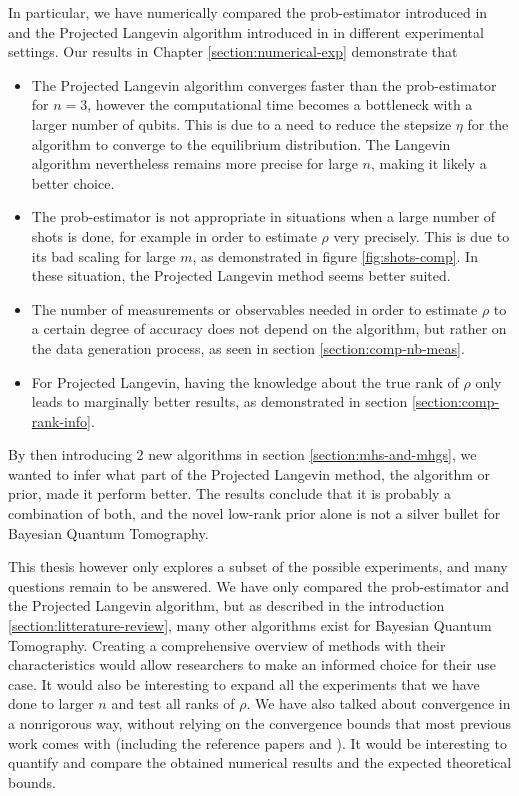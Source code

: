 \documentclass[12pt]{memoir}
\begin{document}
In particular, we have numerically compared the prob-estimator introduced in \cite{MA17} and the Projected Langevin algorithm introduced in \cite{meth:bayesian:Langevin:ACMT2024} in different experimental settings. Our results in Chapter \ref{section:numerical-exp} demonstrate that 
\begin{itemize}
    \item The Projected Langevin algorithm converges faster than the prob-estimator for $n=3$, however the computational time becomes a bottleneck with a larger number of qubits. This is due to a need to reduce the stepsize $\eta$ for the algorithm to converge to the equilibrium distribution. The Langevin algorithm nevertheless remains more precise for large $n$, making it likely a better choice.
    \item The prob-estimator is not appropriate in situations when a large number of shots is done, for example in order to estimate $\rho$ very precisely. This is due to its bad scaling for large $m$, as demonstrated in figure \ref{fig:shots-comp}. In these situation, the Projected Langevin method seems better suited.
    \item The number of measurements or observables needed in order to estimate $\rho$ to a certain degree of accuracy does not depend on the algorithm, but rather on the data generation process, as seen in section \ref{section:comp-nb-meas}.
    \item For Projected Langevin, having the knowledge about the true rank of $\rho$ only leads to marginally better results, as demonstrated in section \ref{section:comp-rank-info}.
\end{itemize}
By then introducing 2 new algorithms in section \ref{section:mhs-and-mhgs}, we wanted to infer what part of the Projected Langevin method, the algorithm or prior, made it perform better. The results conclude that it is probably a combination of both, and the novel low-rank prior alone is not a silver bullet for Bayesian Quantum Tomography.\medbreak 

This thesis however only explores a subset of the possible experiments, and many questions remain to be answered. We have only compared the prob-estimator and the Projected Langevin algorithm, but as described in the introduction \ref{section:litterature-review}, many other algorithms exist for Bayesian Quantum Tomography. Creating a comprehensive overview of methods with their characteristics would allow researchers to make an informed choice for their use case. It would also be interesting to expand all the experiments that we have done to larger $n$ and test all ranks of $\rho$. We have also talked about convergence in a nonrigorous way, without relying on the convergence bounds that most previous work comes with (including the reference papers \cite{MA17} and \cite{meth:bayesian:Langevin:ACMT2024}). It would be interesting to quantify and compare the obtained numerical results and the expected theoretical bounds.\medbreak
\end{document}
